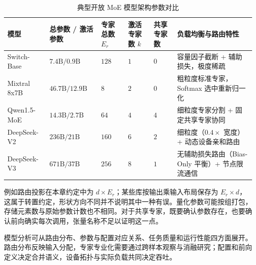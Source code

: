 \documentclass[../textbook.tex]{subfiles}
\begin{document}
\begin{table}[htbp]
\centering
\caption{典型开放 MoE 模型架构参数对比}\label{tab:moe-architectures}
\begin{tabularx}{\linewidth}{lXXXXX}
\toprule
模型 & 总参数 / 激活参数 & 专家总数 $E_r$ & 激活专家数 $k$ & 共享专家数 & 负载均衡与路由特性\\\midrule
Switch-Base & $7.4\text{B} / 0.9\text{B}$ & $128$ & $1$ & $0$ & 容量因子截断 + 辅助损失，极度稀疏\\
Mixtral 8x7B & $46.7\text{B} / 12.9\text{B}$ & $8$ & $2$ & $0$ & 粗粒度标准专家，Softmax 选中重新归一化\\
Qwen1.5-MoE & $14.3\text{B} / 2.7\text{B}$ & $64$ & $4$ & $4$ & 细粒度专家分割 + 固定共享专家协同\\
DeepSeek-V2 & $236\text{B} / 21\text{B}$ & $160$ & $6$ & $2$ & 细粒度（$0.4\times$ 宽度）+ 动态设备亲和路由\\
DeepSeek-V3 & $671\text{B} / 37\text{B}$ & $256$ & $8$ & $1$ & 无辅助损失路由（Bias-Only 平衡）+ 节点限流通信\\
\bottomrule
\end{tabularx}
\end{table}

例如路由投影在本章约定中为 $d\times E_r$；某些库按输出乘输入布局保存为 $E_r\times d$，这属于转置约定，形状方向不同并不说明其中一种有误。量化参数可能按组打包，存储元素数与原始参数计数也不相同。对于共享专家，既要确认参数存在，也要确认前向确实每次调用，张量名称不足以证明这一点。

模型分析可从路由分布、参数与配置对应关系、任务质量和运行性能四方面展开。路由分布反映输入分配，专家专业化需要通过跨样本观察与消融研究；配置和前向定义决定合并语义，设备拓扑与实际负载共同决定吞吐。






\chapterreferences
\myendchapterdocument
\end{document}

